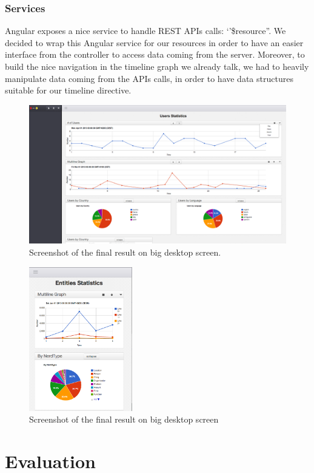 \documentclass[a4paper,13pt]{report}
\begin{document}
\subsection{Services} %
\label{sub:services}
Angular exposes a nice service to handle REST APIs calls: `'\$resource''.
We decided to wrap this Angular service for our resources in order to have an easier interface from the controller to access data coming from the server.
Moreover, to build the nice navigation in the timeline graph we already talk, we had to heavily manipulate data coming from the APIs calls, in order to have data structures suitable for our timeline directive.
\begin{figure}[H]
  \caption{Screenshot of the final result on big desktop screen.}
  \centering
    \includegraphics[width=1\textwidth]{pics/proto/fullDesktop}
\end{figure}
\begin{figure}[H]
  \caption{Screenshot of the final result on big desktop screen}
  \centering
    \includegraphics[width=0.4\textwidth]{pics/proto/fullMobile}
\end{figure}
\label{sub:subsection_name}
\chapter{Evaluation} %
\label{cha:evaluation}
\end{document}

